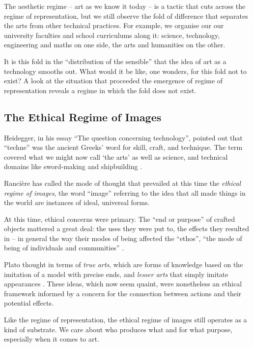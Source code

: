 \documentclass[letter:wpaper]{article}
\begin{document}
    The aesthetic regime -- art as we know it today -- is a tactic that cuts across the regime of representation, but we still observe the fold of difference that separates the arts from other technical practices. For example, we organise our our university faculties and school curriculums along it: science, technology, engineering and maths on one side, the arts and humanities on the other. 
    
    It is this fold in the ``distribution of the sensible'' \citep[p.42]{RancierPltcsOfThAsthtcs2004} that the idea of art as a technology smooths out. What would it be like, one wonders, for this fold not to exist?  A look at the situation that proceeded the emergence of regime of representation reveals a regime in which the fold does not exist.
    
    \subsection{The Ethical Regime of Images}

    Heidegger, in his essay ``The question concerning technology'', pointed out that ``techne'' was the ancient Greeks' word for skill, craft, and technique. The term covered what we might now call ‘the arts’ as well as science, and technical domains like sword-making and shipbuilding \citep[p34]{HeideggerThQstnCncrngTchnlgy1954}.
    
    Rancière has called the mode of thought that prevailed at this time the \emph{ethical regime of images}, the word ``image'' referring to the idea that all made things in the world are instances of ideal, universal forms.

    At this time, ethical concerns were primary. The ``end or purpose'' of crafted objects mattered a great deal: the uses they were put to, the effects they resulted in -- in general the way their modes of being affected the ``ethos'', ``the mode of being of individuals and communities'' \citep[pp.20–21]{RancierPltcsOfThAsthtcs2004}.

    Plato thought in terms of \emph{true arts}, which are forms of knowledge based on the imitation of a model with precise ends, and \emph{lesser arts} that simply imitate appearances \citep[p.20]{RancierPltcsOfThAsthtcs2004}. These ideas, which now seem quaint, were nonetheless an ethical framework informed by a concern for the connection between actions and their potential effects.

    Like the regime of representation, the ethical regime of images still operates as a kind of substrate. We care about who produces what and for what purpose, especially when it comes to art.
    
\end{document}
